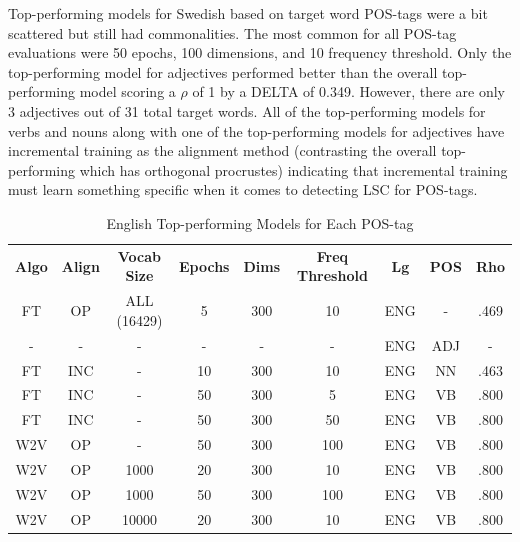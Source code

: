 Top-performing models for Swedish based on target word POS-tags were a bit scattered but still had commonalities. The most common for all POS-tag evaluations were 50 epochs, 100 dimensions, and 10 frequency threshold. Only the top-performing model for adjectives performed better than the overall top-performing model scoring a $\rho$ of 1 by a DELTA of 0.349. However, there are only 3 adjectives out of 31 total target words. All of the top-performing models for verbs and nouns along with one of the top-performing models for adjectives have incremental training as the alignment method (contrasting the overall top-performing which has orthogonal procrustes) indicating that incremental training must learn something specific when it comes to detecting LSC for POS-tags. 


\begin{table}[h]
\centering
\begin{tabular}{ccccccccc} 
\toprule
\textbf{ Algo } & \textbf{ Align } & \textbf{ Vocab Size } & \textbf{ Epochs } & \textbf{ Dims } & \textbf{ Freq Threshold } & \textbf{ Lg } & \textbf{ POS } & \textbf{ Rho }  \\
FT              & OP               & ALL (16429)           & 5                 & 300             & 10                        & ENG           & -              & .469            \\
-               & -                & -                     & -                 & -               & -                         & ENG           & ADJ            & -               \\
FT              & INC              & -                     & 10                & 300             & 10                        & ENG           & NN             & .463            \\
FT              & INC              & -                     & 50                & 300             & 5                         & ENG           & VB             & .800            \\
FT              & INC              & -                     & 50                & 300             & 50                        & ENG           & VB             & .800            \\
W2V             & OP               & -                     & 50                & 300             & 100                       & ENG           & VB             & .800            \\
W2V             & OP               & 1000                  & 20                & 300             & 10                        & ENG           & VB             & .800            \\
W2V             & OP               & 1000                  & 50                & 300             & 100                       & ENG           & VB             & .800            \\
W2V             & OP               & 10000                 & 20                & 300             & 10                        & ENG           & VB             & .800            \\
\bottomrule
\end{tabular}
\caption{English Top-performing Models for Each POS-tag}
\label{tab:eng-posresults}
\end{table}


